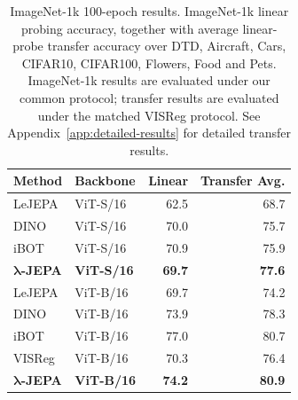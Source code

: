 \documentclass{article} %
\theoremstyle{remark}
\begin{document}
\begin{table}[t]
\centering
\small
\begin{tabular}{llrr}
\toprule
Method & Backbone & Linear & Transfer Avg. \\
\midrule
LeJEPA & ViT-S/16 & 62.5 & 68.7 \\
DINO   & ViT-S/16 & 70.0 & 75.7 \\
iBOT   & ViT-S/16 & 70.9 & 75.9 \\
\textbf{$\bm{\lambda}$-JEPA} & \textbf{ViT-S/16}
& \textbf{69.7} & \textbf{77.6} \\
\midrule
LeJEPA & ViT-B/16 & 69.7 & 74.2 \\
DINO   & ViT-B/16 & 73.9 & 78.3 \\
iBOT   & ViT-B/16 & 77.0 & 80.7 \\
VISReg & ViT-B/16 & 70.3 & 76.4 \\
\textbf{$\bm{\lambda}$-JEPA} & \textbf{ViT-B/16}
& \textbf{74.2} & \textbf{80.9} \\
\bottomrule
\end{tabular}
\caption{
ImageNet-1k 100-epoch results. ImageNet-1k linear probing accuracy,
together with average linear-probe transfer accuracy over DTD, Aircraft,
Cars, CIFAR10, CIFAR100, Flowers, Food and Pets. ImageNet-1k results are
evaluated under our common protocol; transfer results are evaluated under
the matched VISReg protocol. See Appendix~\ref{app:detailed-results} for
detailed transfer results.
}
\label{tab:main-results}
\end{table}
\end{document}
